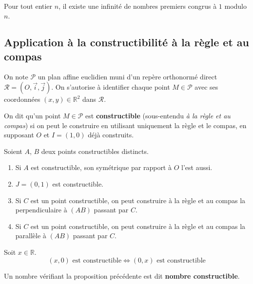 	\begin{application}
		Pour tout entier $n$, il existe une infinité de nombres premiers congrus à $1$ modulo $n$.
	\end{application}
	
	\subsection{Application à la constructibilité à la règle et au compas}
	
	
	On note $\mathcal{P}$ un plan affine euclidien muni d'un repère orthonormé direct $\mathcal{R} = (O, \overrightarrow{i}, \overrightarrow{j})$. On s'autorise à identifier chaque point $M \in \mathcal{P}$ avec ses coordonnées $(x,y) \in \mathbb{R}^2$ dans $\mathcal{R}$.
	
	\begin{definition}
		On dit qu'un point $M \in \mathcal{P}$ est \textbf{constructible} (sous-entendu \textit{à la règle et au compas}) si on peut le construire en utilisant uniquement la règle et le compas, en supposant $O$ et $I=(1,0)$ déjà construits.
	\end{definition}
	
	\begin{proposition}
		Soient $A$, $B$ deux points constructibles distincts.
		\begin{enumerate}[label=(\roman*)]
			\item Si $A$ est constructible, son symétrique par rapport à $O$ l'est aussi.
			\item $J = (0,1)$ est constructible.
			\item Si $C$ est un point constructible, on peut construire à la règle et au compas la perpendiculaire à $(AB)$ passant par $C$.
			\item Si $C$ est un point constructible, on peut construire à la règle et au compas la parallèle à $(AB)$ passant par $C$.
		\end{enumerate}
	\end{proposition}
	
	\begin{proposition}
		Soit $x \in \mathbb{R}$.
		\[ (x,0) \text{ est constructible} \iff (0,x) \text{ est constructible} \]
	\end{proposition}
	
	\begin{definition}
		Un nombre vérifiant la proposition précédente est dit \textbf{nombre constructible}.
	\end{definition}
	
